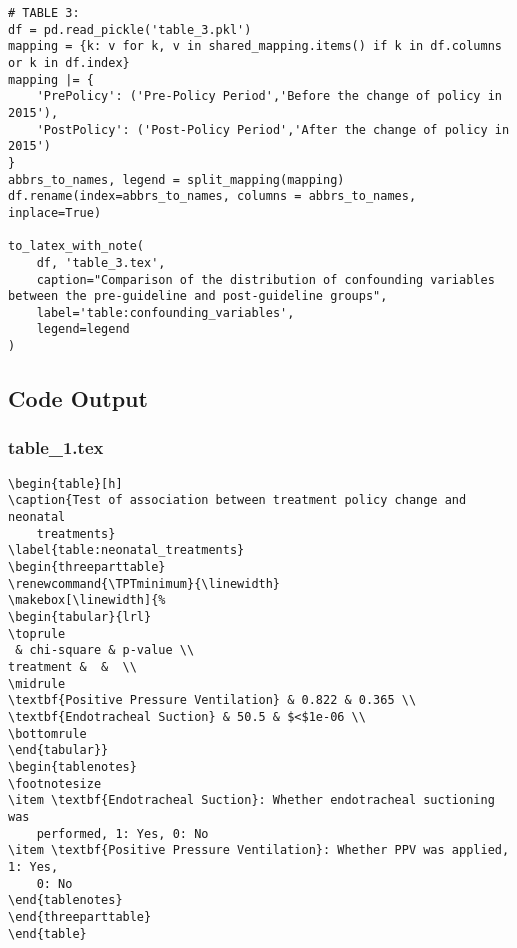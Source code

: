 \documentclass[11pt]{article}
\begin{document}
\begin{verbatim}
# TABLE 3:
df = pd.read_pickle('table_3.pkl')
mapping = {k: v for k, v in shared_mapping.items() if k in df.columns or k in df.index}
mapping |= {
    'PrePolicy': ('Pre-Policy Period','Before the change of policy in 2015'),
    'PostPolicy': ('Post-Policy Period','After the change of policy in 2015')
}
abbrs_to_names, legend = split_mapping(mapping)
df.rename(index=abbrs_to_names, columns = abbrs_to_names, inplace=True)

to_latex_with_note(
    df, 'table_3.tex',
    caption="Comparison of the distribution of confounding variables between the pre-guideline and post-guideline groups", 
    label='table:confounding_variables',
    legend=legend
)

\end{verbatim}



\subsection{Code Output}

\subsubsection*{table\_1.tex}

\begin{Verbatim}[tabsize=4]
\begin{table}[h]
\caption{Test of association between treatment policy change and neonatal
	treatments}
\label{table:neonatal_treatments}
\begin{threeparttable}
\renewcommand{\TPTminimum}{\linewidth}
\makebox[\linewidth]{%
\begin{tabular}{lrl}
\toprule
 & chi-square & p-value \\
treatment &  &  \\
\midrule
\textbf{Positive Pressure Ventilation} & 0.822 & 0.365 \\
\textbf{Endotracheal Suction} & 50.5 & $<$1e-06 \\
\bottomrule
\end{tabular}}
\begin{tablenotes}
\footnotesize
\item \textbf{Endotracheal Suction}: Whether endotracheal suctioning was
	performed, 1: Yes, 0: No
\item \textbf{Positive Pressure Ventilation}: Whether PPV was applied, 1: Yes,
	0: No
\end{tablenotes}
\end{threeparttable}
\end{table}

\end{Verbatim}
\end{document}
